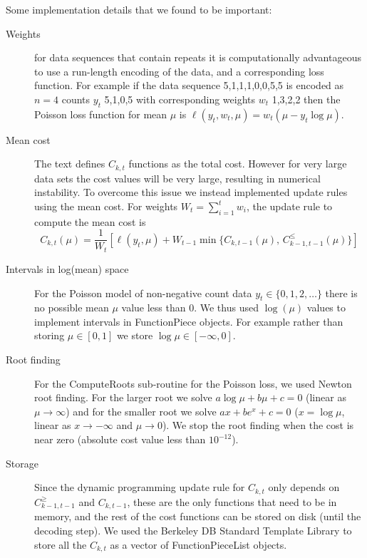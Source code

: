 \documentclass{article}
\begin{document}
Some implementation details that we found to be important:
\begin{description}
\item[Weights] for data sequences that contain repeats it is
  computationally advantageous to use a run-length encoding of the
  data, and a corresponding loss function. For example if the data
  sequence 5,1,1,1,0,0,5,5 is encoded as $n=4$ counts $y_t$ 5,1,0,5 with
  corresponding weights $w_t$ 1,3,2,2 then the Poisson loss function
  for mean $\mu$ is $\ell(y_t, w_t, \mu) = w_t(\mu- y_t\log \mu)$.
\item[Mean cost] The text defines $C_{k,t}$ functions as the total
  cost. However for very large data sets the cost values will be very
  large, resulting in numerical instability. To overcome this issue we
  instead implemented update rules using the mean cost.  For weights
  $W_{t}=\sum_{i=1}^t w_i$, the update rule to compute the mean cost is
$$  C_{k,t}(\mu) = \frac{1}{W_{t}} \left[\ell(y_t, \mu) + 
W_{t-1}
\min\{ C_{k,t-1}(\mu),\, C_{k-1,t-1}^\leq(\mu)  \}\right]$$
\item[Intervals in log(mean) space] For the Poisson model of
  non-negative count data $y_t\in\{0,1,2,\dots\}$ there is no possible
  mean $\mu$ value less than 0. We thus used $\log(\mu)$ values to
  implement intervals in FunctionPiece objects. For example rather
  than storing $\mu\in[0,1]$ we store $\log\mu\in[-\infty, 0]$.
\item[Root finding] For the ComputeRoots sub-routine for the Poisson
  loss, we used Newton root finding. For the larger root we solve
  $a\log\mu + b\mu + c = 0$ (linear as $\mu\rightarrow\infty$) and for
  the smaller root we solve $a x + be^x + c = 0$ ($x=\log \mu$, linear
  as $x\rightarrow -\infty$ and $\mu\rightarrow 0$). We stop the root
  finding when the cost is near zero (absolute cost value less
  than $10^{-12}$).
\item[Storage] Since the dynamic programming update rule for $C_{k,t}$
  only depends on $C_{k-1,t-1}^\geq$ and $C_{k,t-1}$, these are the
  only functions that need to be in memory, and the rest of the cost
  functions can be stored on disk (until the decoding step). We used
  the Berkeley DB Standard Template Library to store all the $C_{k,t}$
  as a vector of FunctionPieceList objects.
\end{description}



\end{document}
